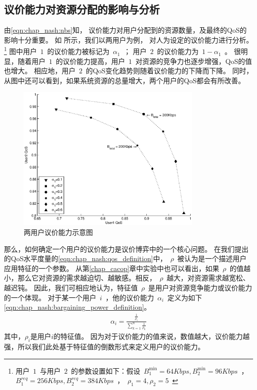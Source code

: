\subsection{议价能力对资源分配的影响与分析}
由\eqref{eqn:chap_nash:nbs}知，
议价能力对用户分配到的资源数量，及最终的QoS的影响十分重要。
如 所示，我们以两用户为例，
对人为设定的议价能力进行分析。
\footnote{用户~$1$~与用户~$2$~的参数设置如下：假设~$B_1^{\min}=64Kbps, B_2^{\min}=96Kbps$~，~$B_1^{req}=256Kbps, B_2^{req}=384Kbps$~，~$\rho_1=4, \rho_2=5$~}
图中用户~$1$~的议价能力被标记为~$\alpha_1$~；
用户~$2$~的议价能力为~$1-\alpha_1$~。
很明显，随着用户~$1$~的议价能力提高，用户~$1$~对资源的竞争力也逐步增强，QoS的值也增大。
相应地，用户~$2$~的QoS变化趋势则随着议价能力的下降而下降。
同时，从图中还可以看到，如果系统资源的总量增大，两个用户的QoS都会有所改善。
\begin{figure}[!tb] 
    \centering 
    \includegraphics[width = 9cm]{chap_nash_two_users_nbs_qos.eps} 
    \caption{两用户议价能力示意图}
    \label{fig:chap_nash:two_users_nbs_qos} 
\end{figure}
那么，如何确定一个用户的议价能力是议价博弈中的一个核心问题。
在我们提出的QoS水平度量的\eqref{eqn:chap_nash:qos_definition}中，~$\rho$~被认为是一个描述用户应用特征的一个参数。
从第\ref{chap_cacop}章中实验中也可以看出，如果~$\rho$~的值越小，那么它对资源的需求越迫切、越敏感。相反，~$\rho$~越大，对资源需求越宽松、越迟钝。
因此，我们可相应地认为，特征值~$\rho$~是用户对资源竞争能力或议价能力的一个体现。
对于某一个用户~$i$~，他的议价能力~$\alpha_i$~定义为如下\eqref{eqn:chap_nash:bargaining_power_definition}。
\begin{align}
    \alpha_i = \frac{\frac{1}{\rho_i}}{\sum_{k=1}^n \frac{1}{\rho_k} }
    \label{eqn:chap_nash:bargaining_power_definition}
\end{align}
其中，$\rho_i$是用户$i$的特征值。
因为对于议价能力的值来说，数值越大，议价能力越强，所以我们此处基于特征值的倒数形式来定义用户的议价能力。


